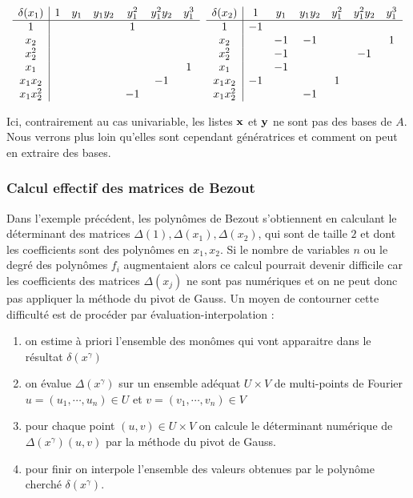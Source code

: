 \documentclass{standalone}
\begin{document}
\begin{exmp}
$$\begin{array}{c|cccccc}
	\delta(x_1) & 1 & y_1 & y_1y_2 & y_1^2 & y_1^2y_2 & y_1^3 \\
	\hline
	1 &  &  &  & 1 &  & \\
	x_2 &  &  &  &  &  & \\
	x_2^2 &  &  &  &  &  & \\
	x_1 &  &  &  &  &  & 1\\
	x_1x_2 &  &  &  &  & -1 & \\
	x_1x_2^2 &  &  &  & -1 &  &
\end{array}
\hspace{0.2cm}
\begin{array}{c|cccccc}
	\delta(x_2) & 1 & y_1 & y_1y_2 & y_1^2 & y_1^2y_2 & y_1^3 \\
	\hline
	1 & -1 &  &  &  &  & \\
	x_2 &  & -1 & -1 &  &  & 1\\
	x_2^2 &  & -1 &  &  & -1 & \\
	x_1 &  & -1 &  &  &  & \\
	x_1x_2 & -1 &  &  & 1 &  & \\
	x_1x_2^2 &  &  & -1 &  &  &
\end{array}$$

\end{exmp}
\begin{rem}
Ici, contrairement au cas univariable, les listes $\bold{x}$ et $\bold{y}$ ne sont pas des bases de $A$. Nous verrons plus loin qu'elles sont cependant génératrices et comment on peut en extraire des bases.
\end{rem}

\subsubsection{Calcul effectif des matrices de Bezout}
Dans l'exemple précédent, les polynômes de Bezout s'obtiennent en calculant le déterminant des matrices $\Delta(1), \Delta(x_1), \Delta(x_2)$, qui sont de taille $2$ et dont les coefficients sont des polynômes en $x_1, x_2$. Si le nombre de variables $n$ ou le degré des polynômes $f_i$ augmentaient alors ce calcul pourrait devenir difficile car les coefficients des matrices $\Delta(x_j)$ ne sont pas numériques et on ne peut donc pas appliquer la méthode du pivot de Gauss. Un moyen de contourner cette difficulté est de procéder par évaluation-interpolation :
\begin{enumerate}
\item
on estime à priori l'ensemble des monômes qui vont apparaitre dans le résultat $\delta(x^\gamma)$
\item
on évalue $\Delta(x^\gamma)$ sur un ensemble adéquat $U \times V$ de multi-points de Fourier $u = (u_1,\cdots, u_n) \in U$ et $v = (v_1,\cdots, v_n) \in V$
\item
pour chaque point $(u, v) \in U\times V$ on calcule le déterminant numérique de $\Delta(x^\gamma)(u, v)$ par la méthode du pivot de Gauss.
\item
pour finir on interpole l'ensemble des valeurs obtenues par le polynôme cherché $\delta(x^\gamma)$.
\end{enumerate}
\end{document}

